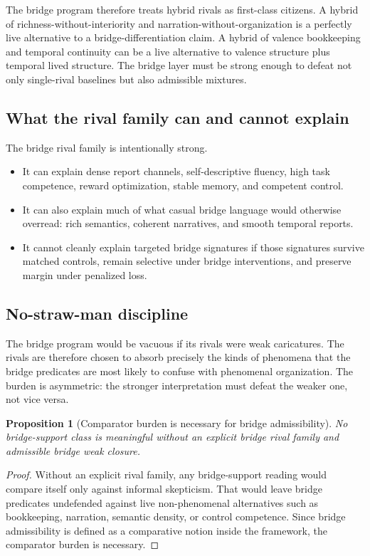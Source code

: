\documentclass[11pt,a4paper]{article}
\newtheorem{proposition}[theorem]{Proposition}
\theoremstyle{definition}
\begin{document}
The bridge program therefore treats hybrid rivals as first-class citizens. A hybrid of richness-without-interiority and narration-without-organization is a perfectly live alternative to a bridge-differentiation claim. A hybrid of valence bookkeeping and temporal continuity can be a live alternative to valence structure plus temporal lived structure. The bridge layer must be strong enough to defeat not only single-rival baselines but also admissible mixtures.

\subsection{What the rival family can and cannot explain}
The bridge rival family is intentionally strong.
\begin{itemize}[leftmargin=1.5em]
\item It can explain dense report channels, self-descriptive fluency, high task competence, reward optimization, stable memory, and competent control.
\item It can also explain much of what casual bridge language would otherwise overread: rich semantics, coherent narratives, and smooth temporal reports.
\item It cannot cleanly explain targeted bridge signatures if those signatures survive matched controls, remain selective under bridge interventions, and preserve margin under penalized loss.
\end{itemize}

\subsection{No-straw-man discipline}
The bridge program would be vacuous if its rivals were weak caricatures. The rivals are therefore chosen to absorb precisely the kinds of phenomena that the bridge predicates are most likely to confuse with phenomenal organization. The burden is asymmetric: the stronger interpretation must defeat the weaker one, not vice versa.

\begin{proposition}[Comparator burden is necessary for bridge admissibility]
No bridge-support class is meaningful without an explicit bridge rival family and admissible bridge weak closure.
\end{proposition}

\begin{proof}
Without an explicit rival family, any bridge-support reading would compare itself only against informal skepticism. That would leave bridge predicates undefended against live non-phenomenal alternatives such as bookkeeping, narration, semantic density, or control competence. Since bridge admissibility is defined as a comparative notion inside the framework, the comparator burden is necessary.
\end{proof}
\end{document}
